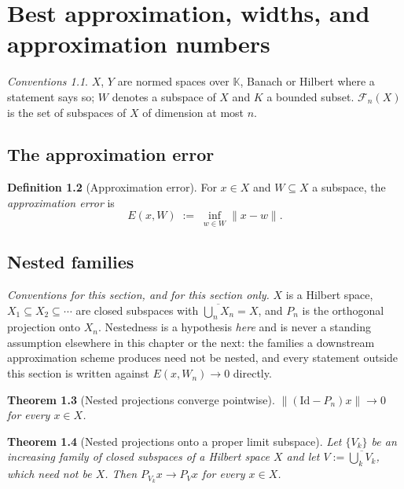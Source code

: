 \documentclass[a4paper]{report}
\theoremstyle{plain}
\newtheorem{theorem}{Theorem}[chapter]
\theoremstyle{definition}
\newtheorem{definition}[theorem]{Definition}
\theoremstyle{remark}
\newtheorem{assumptions}[theorem]{Conventions}
\begin{document}
\chapter{Best approximation, widths, and approximation numbers}
\label{ch_10_best_approximation}

\begin{assumptions}
  \label{asm_best_approximation_widths}
  $X$, $Y$ are normed spaces over $\mathbb{K}$, Banach
or Hilbert where a statement says so; $W$ denotes a subspace of $X$ and $K$ a bounded
subset.  $\mathcal{F}_n(X)$ is the set of subspaces of $X$ of dimension at most $n$.

\end{assumptions}

\section{The approximation error}

\begin{definition}[Approximation error]
  \label{def_approx_error}
  For $x \in X$ and $W \subseteq X$ a subspace, the \emph{approximation error} is
  \[
    E(x,W) \;:=\; \inf_{w \in W}\|x-w\| .
  \]
\end{definition}



\section{Nested families}

\emph{Conventions for this section, and for this section only.}  $X$ is a Hilbert space,
$X_1 \subseteq X_2 \subseteq \cdots$ are closed subspaces with
$\overline{\bigcup_n X_n} = X$, and $P_n$ is the orthogonal projection onto $X_n$.
Nestedness is a hypothesis \emph{here} and is never a standing assumption elsewhere in this
chapter or the next: the families a downstream approximation scheme produces need not be
nested, and every statement outside this section is written against $E(x,W_n) \to 0$
directly.

\begin{theorem}[Nested projections converge pointwise]
  \label{thm_nested_proj}
  $\|(\mathrm{Id}-P_n)x\| \to 0$ for every $x \in X$.
\end{theorem}


\begin{theorem}[Nested projections onto a proper limit subspace]
  \label{thm_nested_proj_proper}
  Let $\{V_k\}$ be an increasing family of closed subspaces of a Hilbert space $X$ and let
  $V := \overline{\bigcup_k V_k}$, which need not be $X$.  Then
  $P_{V_k}x \to P_Vx$ for every $x \in X$.
\end{theorem}
\end{document}
